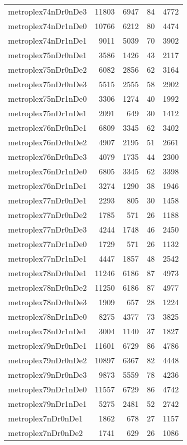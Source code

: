 \begin{longtable}{lrrrr}
metroplex74nDr0nDe3 & 11803 & 6947 & 84 & 4772 \\
metroplex74nDr1nDe0 & 10766 & 6212 & 80 & 4474 \\
metroplex74nDr1nDe1 & 9011 & 5039 & 70 & 3902 \\
metroplex75nDr0nDe1 & 3586 & 1426 & 43 & 2117 \\
metroplex75nDr0nDe2 & 6082 & 2856 & 62 & 3164 \\
metroplex75nDr0nDe3 & 5515 & 2555 & 58 & 2902 \\
metroplex75nDr1nDe0 & 3306 & 1274 & 40 & 1992 \\
metroplex75nDr1nDe1 & 2091 & 649 & 30 & 1412 \\
metroplex76nDr0nDe1 & 6809 & 3345 & 62 & 3402 \\
metroplex76nDr0nDe2 & 4907 & 2195 & 51 & 2661 \\
metroplex76nDr0nDe3 & 4079 & 1735 & 44 & 2300 \\
metroplex76nDr1nDe0 & 6805 & 3345 & 62 & 3398 \\
metroplex76nDr1nDe1 & 3274 & 1290 & 38 & 1946 \\
metroplex77nDr0nDe1 & 2293 & 805 & 30 & 1458 \\
metroplex77nDr0nDe2 & 1785 & 571 & 26 & 1188 \\
metroplex77nDr0nDe3 & 4244 & 1748 & 46 & 2450 \\
metroplex77nDr1nDe0 & 1729 & 571 & 26 & 1132 \\
metroplex77nDr1nDe1 & 4447 & 1857 & 48 & 2542 \\
metroplex78nDr0nDe1 & 11246 & 6186 & 87 & 4973 \\
metroplex78nDr0nDe2 & 11250 & 6186 & 87 & 4977 \\
metroplex78nDr0nDe3 & 1909 & 657 & 28 & 1224 \\
metroplex78nDr1nDe0 & 8275 & 4377 & 73 & 3825 \\
metroplex78nDr1nDe1 & 3004 & 1140 & 37 & 1827 \\
metroplex79nDr0nDe1 & 11601 & 6729 & 86 & 4786 \\
metroplex79nDr0nDe2 & 10897 & 6367 & 82 & 4448 \\
metroplex79nDr0nDe3 & 9873 & 5559 & 78 & 4236 \\
metroplex79nDr1nDe0 & 11557 & 6729 & 86 & 4742 \\
metroplex79nDr1nDe1 & 5275 & 2481 & 52 & 2742 \\
metroplex7nDr0nDe1 & 1862 & 678 & 27 & 1157 \\
metroplex7nDr0nDe2 & 1741 & 629 & 26 & 1086 \\

\end{longtable}
